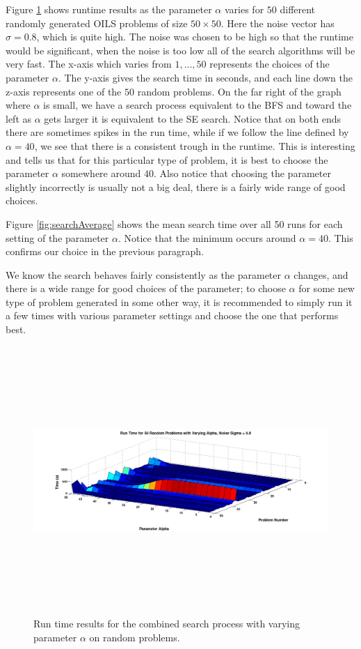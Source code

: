 \documentclass[12pt,Bold,letterpaper]{mcgilletdclass}
\begin{document}
Figure \ref{fig:searchsurface} shows runtime results as the parameter $\alpha$ varies for $50$ different randomly generated OILS problems of size $50 \times 50$. Here the noise vector has $\sigma = 0.8$, which is quite high. The noise was chosen to be high so that the runtime would be significant, when the noise is too low all of the search algorithms will be very fast. The x-axis which varies from $1 , \dots, 50$ represents the choices of the parameter $\alpha$. The y-axis gives the search time in seconds, and each line down the z-axis represents one of the $50$ random problems. On the far right of the graph where $\alpha$ is small, we have a search process equivalent to the BFS and toward the left as $\alpha$ gets larger it is equivalent to the  SE search. Notice that on both ends there are sometimes spikes in the run time, while if we follow the line defined by $\alpha = 40$, we see that there is a consistent trough in the runtime. This is interesting and tells us that for this particular type of problem, it is best to choose the parameter $\alpha$ somewhere around $40$. Also notice that choosing the parameter slightly incorrectly is usually not a big deal, there is a fairly wide range of good choices. 

Figure \ref{fig:searchAverage} shows the mean search time over all 50 runs for each setting of the parameter $\alpha$. Notice that the minimum occurs around $\alpha = 40$. This confirms our choice in the previous paragraph.

We know the search behaves fairly consistently as the parameter $\alpha$ changes, and there is a wide range for good choices of the parameter; to choose $\alpha$ for some new type of problem generated in some other way, it is recommended to simply run it a few times with various parameter settings and choose the one that performs best.

\begin{figure}
\centering
\includegraphics[width=6in, height=4in]{searchsurface.png}
\caption{Run time results for the combined search process with varying parameter $\alpha$ on random problems.}
\label{fig:searchsurface}
\end{figure}
\end{document}
